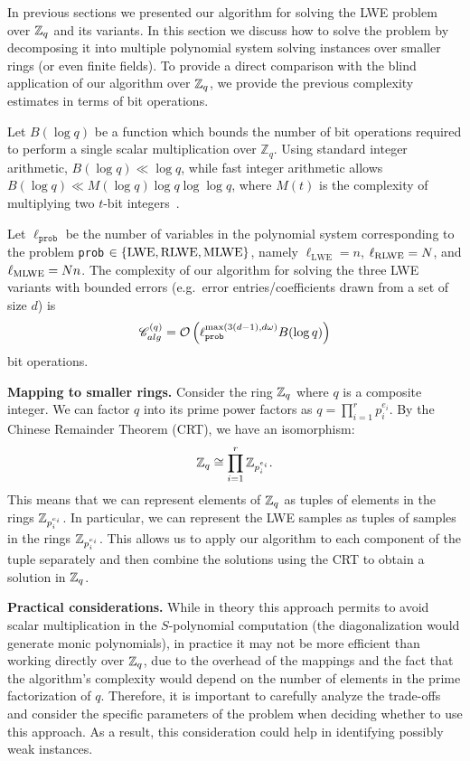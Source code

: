 In previous sections we presented our algorithm for solving the LWE problem over $\mathbb{Z}_q$ and its variants. In this section we discuss how to solve the problem by decomposing it into multiple polynomial system solving instances over smaller rings (or even finite fields). To provide a direct comparison with the blind application of our algorithm over $\mathbb{Z}_q$, we provide the previous complexity estimates in terms of bit operations. 

Let $B(\log q)$ be a function which bounds the number of bit operations required to perform a single scalar multiplication over $\mathbb{Z}_q$. Using
standard integer arithmetic, $B(\log q) \ll \log q$, while fast integer arithmetic allows $B(\log q) \ll M(\log q) \log q \log \log q$, where $M(t)$ is the complexity of multiplying two $t$-bit integers~\cite{DBLP:conf/issac/Storjohann96}.

Let \(\ell_{\texttt{prob}}\) be the number of variables in the polynomial system corresponding to the problem \texttt{prob} $\in \{\text{LWE}, \text{RLWE}, \text{MLWE}\}$, namely \(\ell_{\text{LWE}} = n\), \(\ell_{\text{RLWE}} = N\), and \(\ell_{\text{MLWE}} = Nn\). The complexity of our algorithm for solving the three LWE variants with bounded errors (e.g.\ error entries/coefficients drawn from a set of size $d$) is \[\mathscr{C}^{(q)}_{alg} = \mathcal{O}\left(\ell_{\texttt{prob}}^{\max(3(d-1), d\omega)}B(\log q)\right)\] bit operations. 


\textbf{Mapping to smaller rings.} Consider the ring \(\mathbb{Z}_q\) where \(q\) is a composite integer. 
We can factor \(q\) into its prime power factors as \(q = \prod_{i=1}^r p_i^{e_i}\). By the Chinese Remainder Theorem (CRT), we have an isomorphism:
\[\mathbb{Z}_{q} \cong \prod_{i=1}^r \mathbb{Z}_{p_i^{e_i}}.\]
This means that we can represent elements of \(\mathbb{Z}_{q}\) as tuples of elements in the rings \(\mathbb{Z}_{p_i^{e_i}}\). In particular, we can represent the LWE samples as tuples of samples in the rings \(\mathbb{Z}_{p_i^{e_i}}\). This allows us to apply our algorithm to each component of the tuple separately and then combine the solutions using the CRT to obtain a solution in \(\mathbb{Z}_{q}\).

\noindent
\textbf{Practical considerations.} While in theory this approach permits to avoid scalar multiplication in the $S$-polynomial computation (the diagonalization would generate monic polynomials), in practice it may not be more efficient than working directly over \(\mathbb{Z}_q\), due to the overhead of the mappings and the fact that the algorithm's complexity would depend on the number of elements in the prime factorization of $q$. Therefore, it is important to carefully analyze the trade-offs and consider the specific parameters of the problem when deciding whether to use this approach. As a result, this consideration could help in identifying possibly weak instances.

